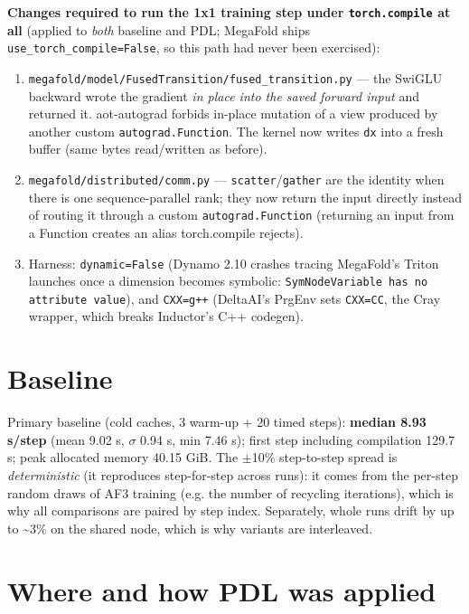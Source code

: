 \documentclass[10pt]{article}
\begin{document}
\textbf{Changes required to run the 1x1 training step under \texttt{torch.compile} at all} (applied to \emph{both} baseline and PDL; MegaFold ships \texttt{use\_torch\_compile=False}, so this path had never been exercised):


\begin{enumerate}
\item \texttt{megafold/model/FusedTransition/fused\_transition.py} --- the SwiGLU backward wrote the gradient \emph{in place into the saved forward input} and returned it. aot-autograd forbids in-place mutation of a view produced by another custom \texttt{autograd.Function}. The kernel now writes \texttt{dx} into a fresh buffer (same bytes read/written as before).
\item \texttt{megafold/distributed/comm.py} --- \texttt{scatter}/\texttt{gather} are the identity when there is one sequence-parallel rank; they now return the input directly instead of routing it through a custom \texttt{autograd.Function} (returning an input from a Function creates an alias torch.compile rejects).
\item Harness: \texttt{dynamic=False} (Dynamo 2.10 crashes tracing MegaFold's Triton launches once a dimension becomes symbolic: \texttt{SymNodeVariable has no attribute value}), and \texttt{CXX=g++} (DeltaAI's PrgEnv sets \texttt{CXX=CC}, the Cray wrapper, which breaks Inductor's C++ codegen).
\end{enumerate}

\section{Baseline}

Primary baseline (cold caches, 3 warm-up + 20 timed steps): \textbf{median 8.93 s/step} (mean 9.02 s, $\sigma$ 0.94 s, min 7.46 s); first step including compilation 129.7 s; peak allocated memory 40.15 GiB. The $\pm$10\% step-to-step spread is \emph{deterministic} (it reproduces step-for-step across runs): it comes from the per-step random draws of AF3 training (e.g. the number of recycling iterations), which is why all comparisons are paired by step index. Separately, whole runs drift by up to \textasciitilde{}3\% on the shared node, which is why variants are interleaved.


\section{Where and how PDL was applied}
\end{document}
